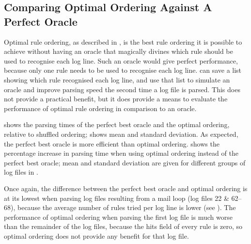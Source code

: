 
\FloatBarrier{}

\subsection{Comparing Optimal Ordering Against A Perfect Oracle}

\label{perfect rule ordering}

Optimal rule ordering, as described in , is the best rule ordering it is possible to achieve without
having an oracle that magically divines which rule should be used to
recognise each log line.  Such an oracle would give perfect performance,
because only one rule needs to be used to recognise each log line.
\parsername{} can save a list showing which rule recognised each log line,
and use that list to simulate an oracle and improve parsing speed the
second time a log file is parsed.  This does not provide a practical
benefit, but it does provide a means to evaluate the performance of optimal
rule ordering in comparison to an oracle.

 shows the parsing times of the perfect best
oracle and the optimal ordering, relative to shuffled ordering;
 shows mean and standard deviation.  As
expected, the perfect best oracle is more efficient than optimal ordering.
 shows the percentage
increase in parsing time when using optimal ordering instead of the perfect
best oracle; mean and standard deviation are given for different groups of
log files in .

Once again, the difference between the perfect best oracle and optimal
ordering is at its lowest when parsing log files resulting from a mail loop
(log files 22 \& 62--68), because the average number of rules tried per log
line is lower (see ).
The performance of optimal ordering when parsing the first log file is much
worse than the remainder of the log files, because the hits field of every
rule is zero, so optimal ordering does not provide any benefit for that log
file.

